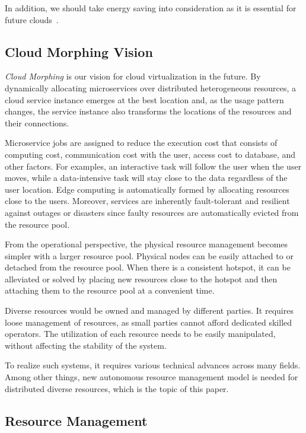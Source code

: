 In addition, we should take energy saving into consideration as it is
essential for future clouds~\cite{Mastelic-2015,masanet2020recalibrating}.

\subsection{Cloud Morphing Vision}

{\em Cloud Morphing} is our vision for cloud virtualization in the future.
By dynamically allocating microservices over distributed
heterogeneous resources, a cloud service instance emerges at the best
location and, as the usage pattern changes, the service instance also
transforms the locations of the resources and their connections.

Microservice jobs are assigned to reduce the execution cost that
consists of computing cost, communication cost with the user, access
cost to database, and other factors.
For examples, an interactive task will follow the user when the user
moves, while a data-intensive task will stay close to the data
regardless of the user location.
Edge computing is automatically formed by allocating resources close to
the users.
Moreover, services are inherently fault-tolerant and resilient
against outages or disasters since faulty resources are
automatically evicted from the resource pool.

From the operational perspective, the physical resource management
becomes simpler with a larger resource pool.
Physical nodes can be easily attached to or detached from the resource pool.
When there is a consistent hotspot, it can be alleviated or solved by
placing new resources close to the hotspot and then attaching them to
the resource pool at a convenient time.

Diverse resources would be owned and managed by different parties.
It requires loose management of resources, as small parties cannot
afford dedicated skilled operators.
The utilization of each resource needs to be easily manipulated,
without affecting the stability of the system.

To realize such systems, it requires various technical advances across
many fields.  Among other things, new autonomous resource management
model is needed for distributed diverse resources,
which is the topic of this paper.

\subsection{Resource Management}


